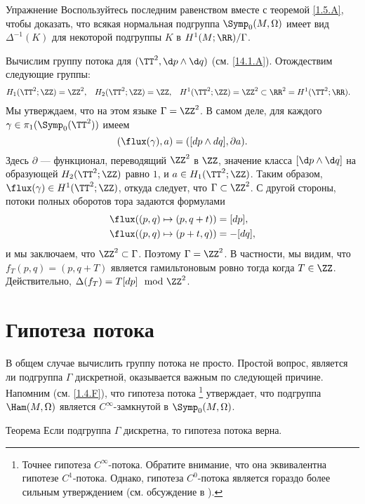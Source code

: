 \begin{ex}{Упражнение}\label{14.1.B}
  Воспользуйтесь последним равенством вместе с теоремой \ref{1.5.A},
  чтобы доказать, что всякая нормальная подгруппа $\Symp_0(M,\Omega)$
  имеет вид $\Delta^{-1}(K)$ для некоторой подгруппы $K$ в
  $H^1(M;\RR)/\Gamma$.
\end{ex}

Вычислим группу потока для $(\TT^2,\d p\wedge \d q)$ (см. \ref{14.1.A}).
Отождествим следующие группы: 
\begin{align*}
H_1(\TT^2;\ZZ)&=\ZZ^2,
&
H_2(\TT^2;\ZZ)&=\ZZ,
&
H^1(\TT^2;\ZZ)&=\ZZ^2
\subset
\RR^2=
H^1(\TT^2;\RR).
\end{align*}
Мы утверждаем, что на этом языке $\Gamma = \ZZ^2$.
В самом деле, для каждого $\gamma\in\pi_1(\Symp_0(\TT^2))$ имеем 
\[(\flux(\gamma), a) = ([dp \wedge dq], \partial a).\]
Здесь $\partial$ — функционал, переводящий $\ZZ^2$ в $\ZZ$, значение
класса $[\d p \wedge \d q]$ на образующей $H_2 (\TT^2;\ZZ)$ равно $1$,
и $a \in H_1 (\TT^2;\ZZ)$.
Таким образом, $\flux(\gamma)\in H^1(\TT^2;\ZZ)$, откуда следует, что
$\Gamma\subset \ZZ^2$.
С другой стороны, потоки полных оборотов тора задаются формулами 
\begin{align*}
\flux( (p, q) \mapsto (p , q+ t))
&=
[dp],
\\
\flux( (p, q) \mapsto (p+ t , q))
&=
-[dq],
\end{align*}
и мы заключаем, что $\ZZ^2 \subset  \Gamma$.
Поэтому $\Gamma = \ZZ^2$.
В частности, мы видим, что $f_T(p, q) = (p, q + T)$ является
гамильтоновым ровно тогда когда $T \in \ZZ$. 
Действительно, $\Delta(f_T) = T[dp] \mod{\ZZ^2}$.

\section{Гипотеза потока}

В общем случае вычислить группу потока не просто. 
Простой вопрос, является ли подгруппа $\Gamma$ дискретной, оказывается важным по
следующей причине. 
Напомним (см. \ref{1.4.F}), что гипотеза потока%
\footnote{Точнее гипотеза $C^\infty$-потока.
Обратите внимание, что она эквивалентна гипотезе $C^1$-потока.
Однако, гипотеза $C^0$-потока является гораздо более сильным утверждением (см. обсуждение в \cite{LMP1}).}
утверждает, что подгруппа $\Ham(M,\Omega)$ является $C^\infty$-замкнутой в $\Symp_0(M,\Omega)$.

\begin{thm}{Теорема}\label{14.2.A}
Если подгруппа $\Gamma$ дискретна, то гипотеза потока верна. 
\end{thm}

